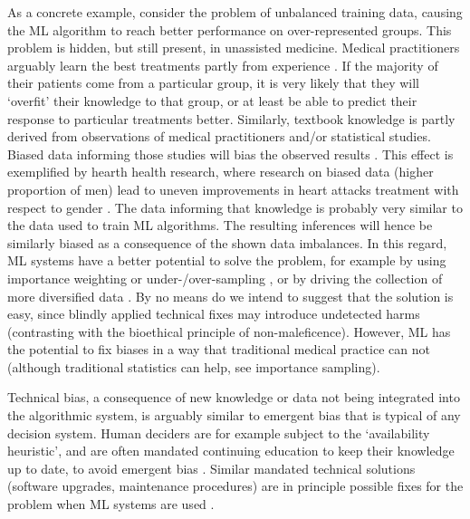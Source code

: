     As a concrete example, consider the problem of unbalanced training data, causing the ML algorithm to reach better performance on over-represented groups.
    This problem is hidden, but still present, in unassisted medicine.
    Medical practitioners arguably learn the best treatments partly from experience \cite{Zerilli2019}.
    If the majority of their patients come from a particular group, it is very likely that they will `overfit' their knowledge to that group, or at least be able to predict their response to particular treatments better.
    Similarly, textbook knowledge is partly derived from observations of medical practitioners and/or statistical studies.
    Biased data informing those studies will bias the observed results \cite{Chen2021}.
    This effect is exemplified by hearth health research, where research on biased data (higher proportion of men) lead to uneven improvements in heart attacks treatment with respect to gender \cite{Mccradden2020}.
    The data informing that knowledge is probably very similar to the data used to train ML algorithms.
    The resulting inferences will hence be similarly biased as a consequence of the shown data imbalances.
    In this regard, ML systems have a better potential to solve the problem, for example by using importance weighting or under-/over-sampling \cite{Chen2021}, or by driving the collection of more diversified data \cite{Zerilli2019}.
    By no means do we intend to suggest that the solution is easy, since blindly applied technical fixes may introduce undetected harms (contrasting with the bioethical principle of non-maleficence).
    However, ML has the potential to fix biases in a way that traditional medical practice can not \cite{Mccradden2020} (although traditional statistics can help, see \eg importance sampling).

    Technical bias, a consequence of new knowledge or data not being integrated into the algorithmic system, is arguably similar to emergent bias that is typical of any decision system.
    Human deciders are for example subject to the `availability heuristic', and are often mandated continuing education to keep their knowledge up to date, to avoid emergent bias \cite{Zerilli2019}.
    Similar mandated technical solutions (software upgrades, maintenance procedures) are in principle possible fixes for the problem when ML systems are used \cite{Zerilli2019}.

